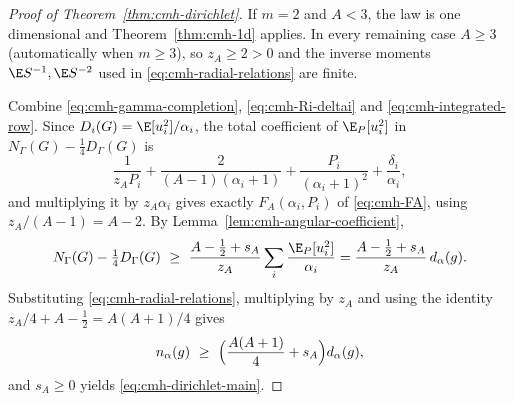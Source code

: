 \documentclass[../../main.tex]{subfiles}
\begin{document}
\begin{proof}[Proof of Theorem~\ref{thm:cmh-dirichlet}]
If $m=2$ and $A<3$, the law is one dimensional and Theorem~\ref{thm:cmh-1d} applies. In every
remaining case $A\ge3$ (automatically when $m\ge3$), so $z_A\ge2>0$ and the inverse moments
$\E S^{-1},\E S^{-2}$ used in \eqref{eq:cmh-radial-relations} are finite.

Combine \eqref{eq:cmh-gamma-completion}, \eqref{eq:cmh-Ri-deltai} and
\eqref{eq:cmh-integrated-row}. Since $D_i(G)=\E[u_i^2]/\alpha_i$, the total coefficient of
$\E_P[u_i^2]$ in $N_\Gamma(G)-\tfrac14D_\Gamma(G)$ is
\[
  \frac1{z_AP_i}+\frac2{(A-1)(\alpha_i+1)}+\frac{P_i}{(\alpha_i+1)^2}+\frac{\delta_i}{\alpha_i},
\]
and multiplying it by $z_A\alpha_i$ gives exactly $F_A(\alpha_i,P_i)$ of \eqref{eq:cmh-FA},
using $z_A/(A-1)=A-2$. By Lemma~\ref{lem:cmh-angular-coefficient},
\[
  N_\Gamma(G)-\tfrac14D_\Gamma(G)
  \ \ge\ \frac{A-\tfrac12+s_A}{z_A}\sum_i\frac{\E_P[u_i^2]}{\alpha_i}
  =\frac{A-\tfrac12+s_A}{z_A}\,d_\alpha(g).
\]
Substituting \eqref{eq:cmh-radial-relations}, multiplying by $z_A$ and using the identity
$z_A/4+A-\tfrac12=A(A+1)/4$ gives
\begin{equation}
  n_\alpha(g)\ \ge\ \Bigl(\frac{A(A+1)}4+s_A\Bigr)d_\alpha(g),
  \label{eq:cmh-dirichlet-surplus}
\end{equation}
and $s_A\ge0$ yields \eqref{eq:cmh-dirichlet-main}.
\end{proof}
\end{document}

